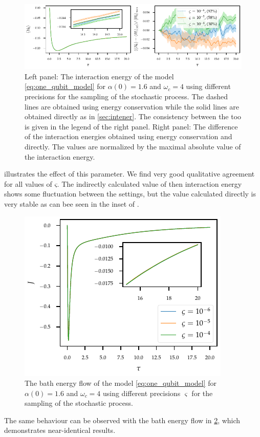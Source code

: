\begin{figure}[h]
  \centering
  \includegraphics{figs/one_bath_syst/stocproc_systematics_interaction}
  \caption{\label{fig:stocproc_systematics} Left panel: The
    interaction energy of the model \cref{eq:one_qubit_model} for
    \(α(0)=1.6\) and \(ω_c=4\) using different precisions for the
    sampling of the stochastic process. The dashed lines are obtained
    using energy conservation while the solid lines are obtained
    directly as in \cref{sec:intener}. The consistency between the too
    is given in the legend of the right panel. Right panel: The
    difference of the interaction energies obtained using energy
    conservation and directly. The values are normalized by the
    maximal absolute value of the interaction energy.}
\end{figure}
 illustrates the effect of this
parameter. We find very good qualitative agreement for all values of
\(ς\). The indirectly calculated value of then interaction energy
shows some fluctuation between the settings, but the value calculated
directly is very stable as can bee seen in the inset of
.

\begin{figure}
  \centering
  \includegraphics{figs/one_bath_syst/stocproc_systematics_flow}
  \caption{\label{fig:stocprocflow}The bath energy flow of the model
    \cref{eq:one_qubit_model} for \(α(0)=1.6\) and \(ω_c=4\) using
    different precisions \(\varsigma\) for the sampling of the
    stochastic process.}
\end{figure}
The same behaviour can be observed with the bath energy flow in
\cref{fig:stocprocflow}, which demonstrates near-identical results.

